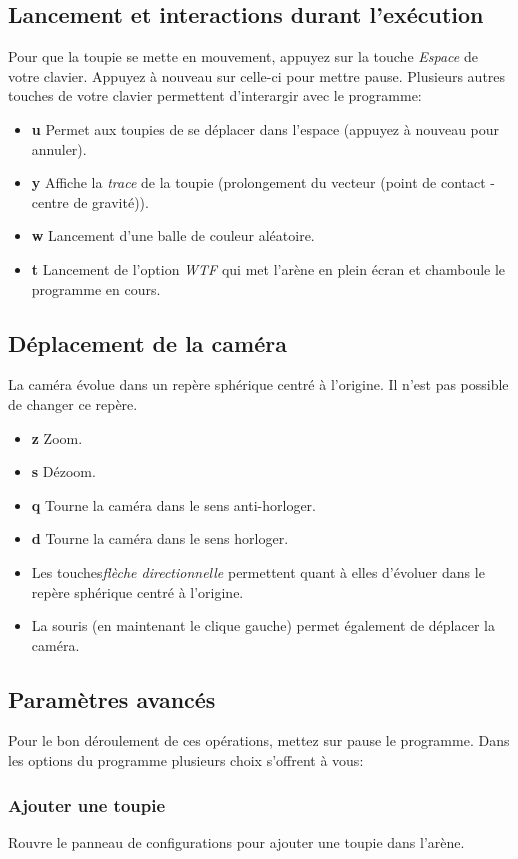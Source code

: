 \documentclass[a4paper]{article}%
\begin{document}
	\subsection {Lancement et interactions durant l'exécution}
		Pour que la toupie se mette en mouvement, appuyez sur  la touche \emph{Espace} de votre clavier. Appuyez à nouveau sur celle-ci pour mettre pause. Plusieurs autres touches de votre clavier permettent d'interargir avec le programme: 
		\begin {itemize} 
			\item[\textbf{u}] Permet aux toupies de se déplacer dans l'espace (appuyez à nouveau pour annuler).
			\item[\textbf{y}] Affiche la \emph{trace} de la toupie (prolongement du vecteur (point de contact - centre de gravité)).
			\item[\textbf{w}] Lancement d'une balle de couleur aléatoire.
			\item[\textbf{t}] Lancement de l'option \emph {WTF} qui met l'arène en plein écran et chamboule le programme en cours.
			
		\end {itemize}
	\subsection {Déplacement de la caméra}
		La caméra évolue dans un repère sphérique centré à l'origine. Il n'est pas possible de changer ce repère.
		\begin {itemize}
			\item[\textbf{z}] Zoom.
			\item[\textbf{s}] Dézoom.
			\item[\textbf{q}] Tourne la caméra dans le sens anti-horloger.
			\item[\textbf{d}] Tourne la caméra dans le sens horloger.
			\item Les touches\emph {flèche directionnelle} permettent quant à elles d'évoluer dans le repère sphérique centré à l'origine.
			\item La souris (en maintenant le clique gauche) permet également de déplacer la caméra.
		\end{itemize}
	\subsection {Paramètres avancés}
		Pour le bon déroulement de ces opérations, mettez sur pause le programme.
		Dans les options du programme plusieurs choix s'offrent à vous:
		\subsubsection {Ajouter une toupie}
			Rouvre le panneau de configurations pour ajouter une toupie dans l'arène. 
\end{document}
